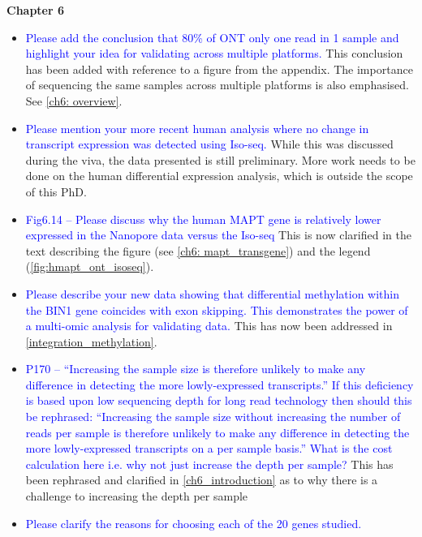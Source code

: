 \documentclass[a4paper,12pt,oneside]{report}
\begin{document}
\vspace{1cm}
\textbf{Chapter 6}
\begin{itemize}
	\item \textcolor{blue}{Please add the conclusion that 80\% of ONT only one read in 1 sample and highlight your idea for validating across multiple platforms.}
	\newline This conclusion has been added with reference to a figure from the appendix. The importance of sequencing the same samples across multiple platforms is also emphasised. See \cref{ch6: overview}.
	\item \textcolor{blue}{Please mention your more recent human analysis where no change in transcript expression was detected using Iso-seq.}
	\newline While this was discussed during the viva, the data presented is still preliminary. More work needs to be done on the human differential expression analysis, which is outside the scope of this PhD. 
	\item \textcolor{blue}{Fig6.14 – Please discuss why the human MAPT gene is relatively lower expressed in the Nanopore data versus the Iso-seq}
	\newline This is now clarified in the text describing the figure (see \cref{ch6: mapt_transgene}) and the legend (\cref{fig:hmapt_ont_isoseq}).
	\item \textcolor{blue}{Please describe your new data showing that differential methylation within the BIN1 gene coincides with exon skipping. This demonstrates the power of a multi-omic analysis for validating data.}
	\newline This has now been addressed in \cref{integration_methylation}.
	\item \textcolor{blue}{P170 – “Increasing the sample size is therefore unlikely to make any difference in detecting the more lowly-expressed transcripts.” If this deficiency is based upon low sequencing depth for long read technology then should this be rephrased: “Increasing the sample size without increasing the number of reads per sample is therefore unlikely to make any difference in detecting the more lowly-expressed transcripts on a per sample basis.” What is the cost calculation here i.e. why not just increase the depth per sample?} 
	\newline This has been rephrased and clarified in \cref{ch6_introduction} as to why there is a challenge to increasing the depth per sample
	\item \textcolor{blue}{Please clarify the reasons for choosing each of the 20 genes studied.}

\end{itemize}
\end{document}
